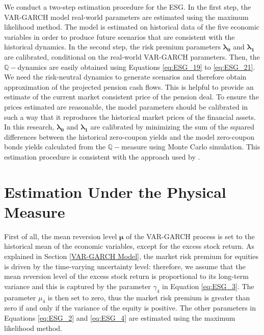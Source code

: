 \documentclass{sfuthesis}
\numberwithin{equation}{chapter}
\begin{document}
		\justify
		We conduct a two-step estimation procedure for the ESG. In the first step, the VAR-GARCH model real-world parameters are estimated using the maximum likelihood method. The model is estimated on historical data of the five economic variables in order to produce future scenarios that are consistent with the historical dynamics. In the second step, the risk premium parameters $\boldsymbol{\lambda_0}$ and $\boldsymbol{\lambda_1}$ are calibrated, conditional on the real-world VAR-GARCH parameters. Then, the $\mathbb{Q}-$dynamics are easily obtained using Equations \eqref{eq:ESG_19} to \eqref{eq:ESG_21}. We need the risk-neutral dynamics to generate scenarios and therefore obtain approximation of the projected pension cash flows. This is helpful to provide an estimate of the current market consistent price of the pension deal. To ensure the prices estimated are reasonable, the model parameters should be calibrated in such a way that it reproduces the historical market prices of the financial assets. In this research, $\boldsymbol{\lambda_0}$ and $\boldsymbol{\lambda_1}$ are calibrated by minimizing the sum of the squared differences between the historical zero-coupon yields and the model zero-coupon bonds yields calculated from the $\mathbb{Q}-$measure using Monte Carlo simulation. This estimation procedure is consistent with the approach used by \citet{Hoevenaars2008}.
	
	
	\section{Estimation Under the Physical Measure} 
	\label{Estimation Under the Physical Measure}
	
		\justify
		First of all, the mean reversion level $\boldsymbol{\mu}$ of the VAR-GARCH process is set to the historical mean of the economic variables, except for the excess stock return. As explained in Section \ref{VAR-GARCH Model}, the market risk premium for equities is driven by the time-varying uncertainty level: therefore, we assume that the mean reversion level of the excess stock return is proportional to its long-term variance and this is captured by the parameter $\gamma_{4}$ in Equation \eqref{eq:ESG_3}. The parameter $\mu_{4}$ is then set to zero, thus the market risk premium is greater than zero if and only if the variance of the equity is positive. The other parameters in Equations \eqref{eq:ESG_2} and \eqref{eq:ESG_4} are estimated using the maximum likelihood method. 
		
	
\end{document}
